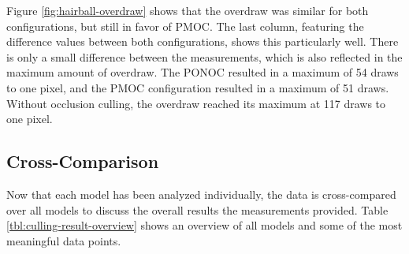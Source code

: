 \noindent
Figure \ref{fig:hairball-overdraw} shows that the overdraw was similar for both configurations, 
but still in favor of \ac{PMOC}. The last column, featuring the difference values between both 
configurations, shows this particularly well. There is only a small difference between the  
measurements, which is also reflected in the maximum amount of overdraw. The \ac{PONOC} resulted 
in a maximum of 54 draws to one pixel, and the \ac{PMOC} configuration resulted in a maximum of 
51 draws. Without occlusion culling, the overdraw reached its maximum at 117 draws to one pixel.

\clearpage


\subsection*{Cross-Comparison}

Now that each model has been analyzed individually, the data is cross-compared over all models to 
discuss the overall results the measurements provided. Table \ref{tbl:culling-result-overview} shows 
an overview of all models and some of the most meaningful data points. 
  

